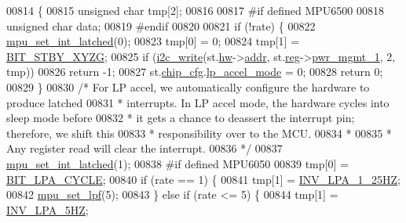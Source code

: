 \begin{DoxyCode}
00814 \{
00815     \textcolor{keywordtype}{unsigned} \textcolor{keywordtype}{char} tmp[2];
00816 
00817 \textcolor{preprocessor}{#if defined MPU6500}
00818     \textcolor{keywordtype}{unsigned} \textcolor{keywordtype}{char} data;
00819 \textcolor{preprocessor}{#endif}
00820 
00821     \textcolor{keywordflow}{if} (!rate) \{
00822         \hyperlink{group___d_r_i_v_e_r_s_ga653cb855300bff9285ce4b8dca6a503b}{mpu\_set\_int\_latched}(0);
00823         tmp[0] = 0;
00824         tmp[1] = \hyperlink{inv__mpu_8c_a4e2ef22b94b90f9b83394dfe1f688ce4}{BIT\_STBY\_XYZG};
00825         \textcolor{keywordflow}{if} (\hyperlink{_i2_c_8c_ac0f145afe8d662af199043939f4398d6}{i2c\_write}(st.\hyperlink{structgyro__state__s_a5bac30a96752691e4cc723735060e360}{hw}->\hyperlink{structhw__s_a4c34a946600e9d68b6355d23f54d291b}{addr}, st.\hyperlink{structgyro__state__s_ae857e1285c583b7438a208edd691a38e}{reg}->\hyperlink{structgyro__reg__s_ad746a196c317f0f4d557a92b9eb98d34}{pwr\_mgmt\_1}, 2, tmp))
00826             \textcolor{keywordflow}{return} -1;
00827         st.\hyperlink{structgyro__state__s_ac895217592e2084bd520b0be8e9d20ee}{chip\_cfg}.\hyperlink{structchip__cfg__s_aeb8fb45fc306b199be68b3f61940fbb0}{lp\_accel\_mode} = 0;
00828         \textcolor{keywordflow}{return} 0;
00829     \}
00830     \textcolor{comment}{/* For LP accel, we automatically configure the hardware to produce latched}
00831 \textcolor{comment}{     * interrupts. In LP accel mode, the hardware cycles into sleep mode before}
00832 \textcolor{comment}{     * it gets a chance to deassert the interrupt pin; therefore, we shift this}
00833 \textcolor{comment}{     * responsibility over to the MCU.}
00834 \textcolor{comment}{     *}
00835 \textcolor{comment}{     * Any register read will clear the interrupt.}
00836 \textcolor{comment}{     */}
00837     \hyperlink{group___d_r_i_v_e_r_s_ga653cb855300bff9285ce4b8dca6a503b}{mpu\_set\_int\_latched}(1);
00838 \textcolor{preprocessor}{#if defined MPU6050}
00839     tmp[0] = \hyperlink{inv__mpu_8c_a63e6f23af37626aa1498d8c248f259e7}{BIT\_LPA\_CYCLE};
00840     \textcolor{keywordflow}{if} (rate == 1) \{
00841         tmp[1] = \hyperlink{inv__mpu_8c_a23c3fcde795e5aa2b141232d490c9ca7ab44c7d0127a9466747853533a537b567}{INV\_LPA\_1\_25HZ};
00842         \hyperlink{group___d_r_i_v_e_r_s_ga5661a9dee25152166769910767a2a93d}{mpu\_set\_lpf}(5);
00843     \} \textcolor{keywordflow}{else} \textcolor{keywordflow}{if} (rate <= 5) \{
00844         tmp[1] = \hyperlink{inv__mpu_8c_a23c3fcde795e5aa2b141232d490c9ca7a474cac76bff369dd656cc973207a1ca5}{INV\_LPA\_5HZ};

\end{DoxyCode}
